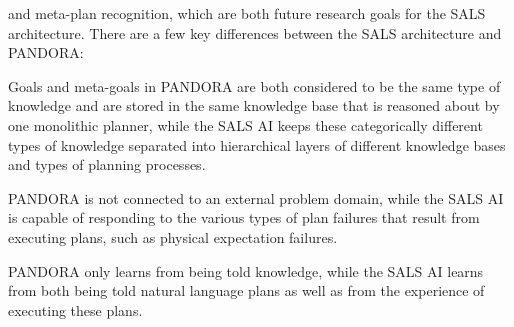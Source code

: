 and meta-plan recognition, which are both future research goals for
the SALS architecture.  There are a few key differences between the
SALS architecture and PANDORA:
\begin{packed_enumerate}
\item{Goals and meta-goals in PANDORA are both considered to be the
  same type of knowledge and are stored in the same knowledge base
  that is reasoned about by one monolithic planner, while the SALS AI
  keeps these categorically different types of knowledge separated
  into hierarchical layers of different knowledge bases and types of
  planning processes.}
\item{PANDORA is not connected to an external problem domain, while
  the SALS AI is capable of responding to the various types of plan
  failures that result from executing plans, such as physical
  expectation failures.}
\item{PANDORA only learns from being told knowledge, while the SALS AI
  learns from both being told natural language plans as well as from
  the experience of executing these plans.}
\end{packed_enumerate}

